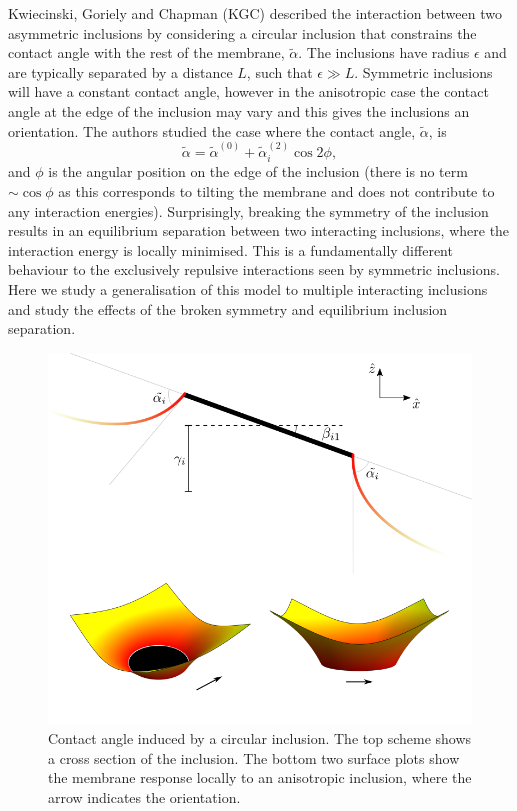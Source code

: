 Kwiecinski, Goriely and Chapman (KGC)\cite{kwiecinski_interactions_2020} described the interaction between two asymmetric inclusions by considering a circular inclusion that constrains the contact angle with the rest of the membrane, $\tilde{\alpha}$. The inclusions have radius $\epsilon$ and are typically separated by a distance $L$, such that $\epsilon \gg L$. Symmetric inclusions will have a constant contact angle, however in the anisotropic case the contact angle at the edge of the inclusion may vary and this gives the inclusions an orientation. The authors studied the case where the contact angle, $\tilde{\alpha}$, is
\begin{equation}
    \tilde{\alpha}=\tilde{\alpha}^{(0)} + \tilde{\alpha}^{(2)}_i\cos2\phi,
\end{equation}
and $\phi$ is the angular position on the edge of the inclusion (there is no term $\sim\cos\phi$ as this corresponds to tilting the membrane and does not contribute to any interaction energies). Surprisingly, breaking the symmetry of the inclusion results in an equilibrium separation between two interacting inclusions, where the interaction energy is locally minimised. This is a fundamentally different behaviour to the exclusively repulsive interactions seen by symmetric inclusions. Here we study a generalisation of this model to multiple interacting inclusions and study the effects of the broken symmetry and equilibrium inclusion separation.

\begin{figure}[h]
\centering
\includegraphics[width=12cm]{elastic_figs/conttil.png}
\caption{Contact angle induced by a circular inclusion. The top scheme shows a cross section of the inclusion. The bottom two surface plots show the membrane response locally to an anisotropic inclusion, where the arrow indicates the orientation.}
\end{figure}

